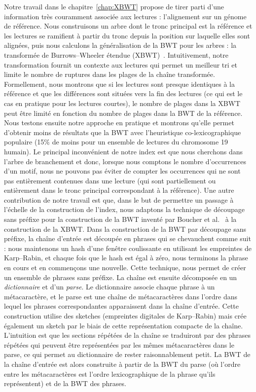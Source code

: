 Notre travail dans le chapitre~\ref{chap:XBWT} propose de tirer parti d'une information très couramment associée aux lectures : l'alignement sur un génome de référence. Nous construisons un arbre dont le tronc principal est la référence et les lectures se ramifient à partir du tronc depuis la position sur laquelle elles sont alignées, puis nous calculons la généralisation de la BWT pour les arbres : la transformée de Burrows--Wheeler étendue (XBWT)~\cite{ferragina2009compressing}. Intuitivement, notre transformation fournit un contexte aux lectures qui permet un meilleur tri et limite le nombre de ruptures dans les plages de la chaîne transformée. Formellement, nous montrons que si les lectures sont presque identiques à la référence et que les différences sont situées vers la fin des lectures (ce qui est le cas en pratique pour les lectures courtes), le nombre de plages dans la XBWT peut être limité en fonction du nombre de plages dans la BWT de la référence. Nous testons ensuite notre approche en pratique et montrons qu'elle permet d'obtenir moins de résultats que la BWT avec l'heuristique co-lexicographique populaire (15\% de moins pour un ensemble de lectures du chromosome 19 humain).
Le principal inconvénient de notre index est que nous cherchons dans l'arbre de branchement et donc, lorsque nous comptons le nombre d'occurrences d'un motif, nous ne pouvons pas éviter de compter les occurrences qui ne sont pas entièrement contenues dans une lecture (qui sont partiellement ou entièrement dans le tronc principal correspondant à la référence).
%
Une autre contribution de notre travail est que, dans le but de permettre un passage à l'échelle de la construction de l'index, nous adaptons la technique de découpage sans préfixe pour la construction de la BWT inventé par Boucher et al.~\cite{boucher2019prefix} à la construction de la XBWT. 
%
Dans la construction de la BWT par découpage sans préfixe, la chaîne d'entrée est découpée en phrases qui se chevauchent comme suit : nous maintenons un hash d'une fenêtre coulissante en utilisant les empreintes de Karp--Rabin, et chaque fois que le hash est égal à zéro, nous terminons la phrase en cours et en commençons une nouvelle. Cette technique, nous permet de créer un ensemble de phrases sans préfixe.
La chaîne est ensuite décomposée en un \emph{dictionnaire} et d'un \emph{parse}. 
Le dictionnaire associe chaque phrase à un métacaractère, et le parse est une chaîne de métacaractères dans l'ordre dans lequel les phrases correspondantes apparaissent dans la chaîne d'entrée.
Cette construction utilise des sketches (empreintes digitales de Karp--Rabin) mais crée également un sketch par le biais de cette représentation compacte de la chaîne.
L'intuition est que les sections répétées de la chaîne se traduiront par des phrases répétées qui peuvent être représentées par les mêmes métacaractères dans le parse, ce qui permet au dictionnaire de rester raisonnablement petit.
La BWT de la chaîne d'entrée est alors construite à partir de la BWT du parse (où l'ordre entre les métacaractères est l'ordre lexicographique de la phrase qu'ils représentent) et de la BWT des phrases.
